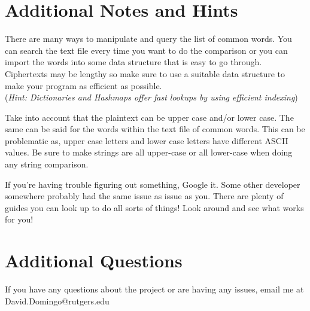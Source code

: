 \documentclass{article}
\begin{document}
\section{Additional Notes and Hints}
\begin{info} %
There are many ways to manipulate and query the list of common words. You can search the text file every time you want to do the comparison or you can import the words into some data structure that is easy to go through. Ciphertexts may be lengthy so make sure to use a suitable data structure to make your program as efficient as possible.\\(\textit{Hint: Dictionaries and Hashmaps offer fast lookups by using efficient indexing})
\end{info}
\begin{info} %
Take into account that the plaintext can be upper case and/or lower case. The same can be said for the words within the text file of common words. This can be problematic as, upper case letters and lower case letters have different ASCII values. Be sure to make strings are all upper-case or all lower-case when doing any string comparison.
\end{info}
\begin{info} %
If you’re having trouble figuring out something, Google it. Some other developer somewhere probably had the same issue as issue as you. There are plenty of guides you can look up to do all sorts of things! Look around and see what works for you!
\end{info}


\section{Additional Questions}
If you have any questions about the project or are having any issues, email me at David.Domingo@rutgers.edu
\end{document}
